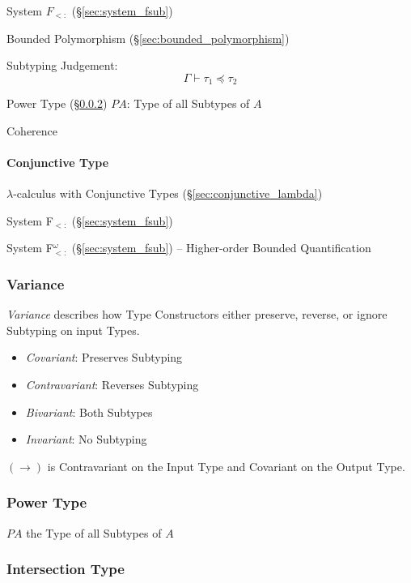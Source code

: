 System $F_{<:}$ (\S\ref{sec:system_fsub})

Bounded Polymorphism (\S\ref{sec:bounded_polymorphism})

Subtyping Judgement:
\[
  \Gamma \vdash \tau_1 \preceq \tau_2
\]

Power Type (\S\ref{sec:power_type}) $P A$: Type of all Subtypes of $A$

Coherence



\paragraph{Conjunctive Type}\label{sec:conjunctive_type}\hfill

$\lambda$-calculus with Conjunctive Types
(\S\ref{sec:conjunctive_lambda})

System F$_{<:}$ (\S\ref{sec:system_fsub})

System F$_{<:}^\omega$ (\S\ref{sec:system_fsub}) -- Higher-order
Bounded Quantification



\subsubsection{Variance}\label{sec:type_variance}

\emph{Variance} describes how Type Constructors either preserve,
reverse, or ignore Subtyping on input Types.

\begin{itemize}
  \item \emph{Covariant}: Preserves Subtyping
  \item \emph{Contravariant}: Reverses Subtyping
  \item \emph{Bivariant}: Both Subtypes
  \item \emph{Invariant}: No Subtyping
\end{itemize}

$(\rightarrow)$ is Contravariant on the Input Type and Covariant on
the Output Type.



\subsubsection{Power Type}\label{sec:power_type}

$P A$ the Type of all Subtypes of $A$



\subsubsection{Intersection Type}\label{sec:intersection_type}

